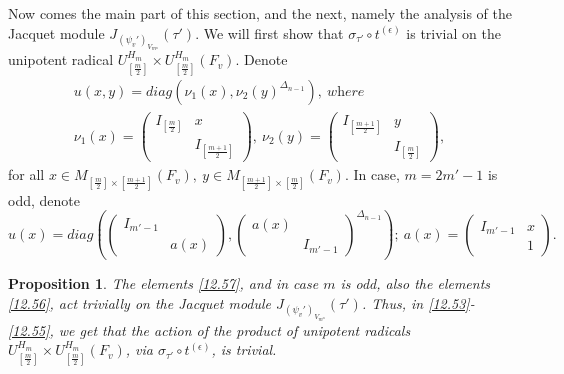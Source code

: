 \documentclass[12pts]{amsart}
\newtheorem{prop}[thm]{Proposition}
\begin{document}
Now comes the main part of this section, and the next, namely the analysis of the Jacquet module $J_{(\psi_v')_{V_{m^n}}}(\tau')$.  We will first show that $\sigma_{\tau'}\circ t^{(\epsilon)}$ is trivial on the unipotent radical $U_{[\frac{m}{2}]}^{H_m}\times U_{[\frac{m}{2}]}^{H_m}(F_v)$. Denote
\begin{multline}\label{12.57}
u(x,y)=diag(\nu_1(x),\nu_2(y)^{\Delta_{n-1}}),\ \textit{where}\\
\nu_1(x)=\begin{pmatrix}I_{[\frac{m}{2}]}&x\\&I_{[\frac{m+1}{2}]}\end{pmatrix},\
\nu_2(y)=\begin{pmatrix}I_{[\frac{m+1}{2}]}&y\\&I_{[\frac{m}{2}]}\end{pmatrix},
\end{multline}
for all $ x\in M_{[\frac{m}{2}]\times [\frac{m+1}{2}]}(F_v),\ y\in M_{[\frac{m+1}{2}]\times [\frac{m}{2}]}(F_v)$. In case, $m=2m'-1$ is odd, denote
\begin{equation}\label{12.56}
u(x)=diag(\begin{pmatrix}I_{m'-1}\\&a(x)\end{pmatrix}, \begin{pmatrix}a(x)\\&I_{m'-1}\end{pmatrix}^{\Delta_{n-1}});\ a(x)=\begin{pmatrix}I_{m'-1}&x\\&1\end{pmatrix}.
\end{equation}
\begin{prop}\label{prop 12.6}
The elements \eqref{12.57}, and in case $m$ is odd, also the elements \eqref{12.56}, act trivially on the Jacquet module $J_{(\psi_v')_{V_{m^n}}}(\tau')$. Thus, in \eqref{12.53}-\eqref{12.55}, we get that the action of the product of unipotent radicals $U_{[\frac{m}{2}]}^{H_m}\times U_{[\frac{m}{2}]}^{H_m}(F_v)$, via $\sigma_{\tau'}\circ t^{(\epsilon)}$, is trivial.
\end{prop}	
\end{document}
